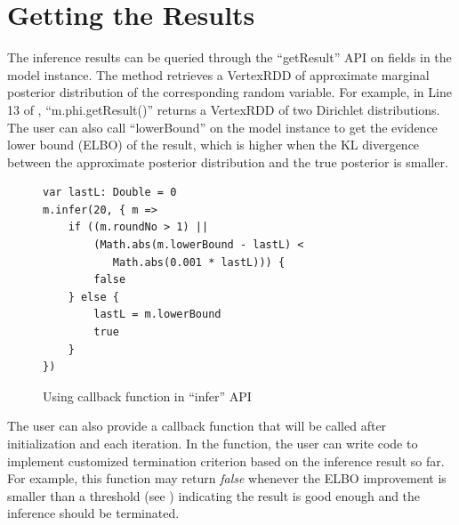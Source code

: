 \section{Getting the Results}
The inference results can be queried through the ``{\sf getResult}''
API on fields in the model instance. The method retrieves a VertexRDD of approximate
marginal posterior distribution of the corresponding random variable. For
example, in Line 13 of , ``{\sf m.phi.getResult()}'' 
returns a VertexRDD of two Dirichlet distributions. 
The user can also call ``{\sf lowerBound}'' 
on the model instance to get the evidence lower bound (ELBO) of the result, 
which is higher when the KL divergence between the approximate posterior 
distribution and the true posterior is smaller. 

\begin{figure}[h]
\centering
\begin{lstlisting}
var lastL: Double = 0
m.infer(20, { m =>
	if ((m.roundNo > 1) || 
		(Math.abs(m.lowerBound - lastL) < 
		   Math.abs(0.001 * lastL))) {
		false
	} else {
		lastL = m.lowerBound
		true	
	}
})
\end{lstlisting}
\caption{Using callback function in ``infer'' API}
\label{fig:two_coins_callback}
\end{figure}

The user can also provide a callback function that will be called after
initialization and each iteration. In the function, the user can write code to
implement customized termination criterion based on the inference result so
far.  For example, this function may return {\em false} whenever the ELBO
improvement is smaller than a threshold (see )
indicating the result is good enough and the inference should be terminated. 

